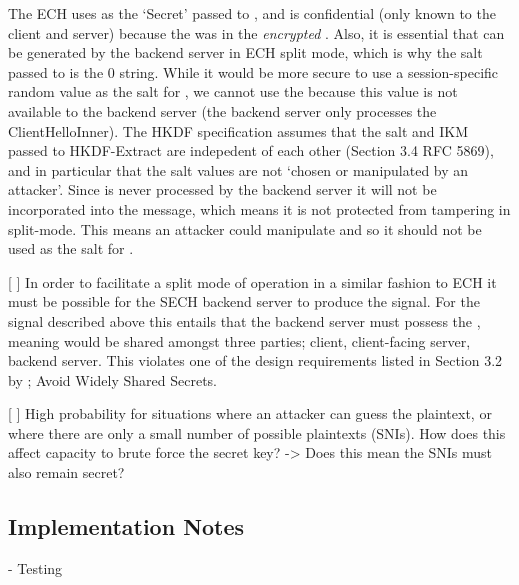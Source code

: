 The ECH  uses  as the `Secret' passed to , and  is confidential (only known to the client and server) because the  was in the {\em encrypted} . Also, it is essential that  can be generated by the backend server in ECH split mode, which is why the salt passed to  is the 0 string. While it would be more secure to use a session-specific random value as the salt for , we cannot use the  because this value is not available to the backend server (the backend server only processes the ClientHelloInner). The HKDF specification assumes that the salt and IKM passed to HKDF-Extract are indepedent of each other (Section 3.4 RFC 5869), and in particular that the salt values are not `chosen or manipulated by an attacker'.
Since  is never processed by the backend server it will not be incorporated into the  message, which means it is not protected from tampering in split-mode. This means an attacker could manipulate  and so it should not be used as the salt for .

[ ] In order to facilitate a split mode of operation in a similar fashion to ECH it must be possible for the SECH backend server to produce  the  signal. For the signal described above this entails that the backend server must possess the , meaning  would be shared amongst three parties; client, client-facing server, backend server. This violates one of the design requirements listed in Section 3.2 by \cite{rfc8744-issues}; Avoid Widely Shared Secrets.

[ ] High probability for situations where an attacker can guess the plaintext, or where there are only a small number of possible plaintexts (SNIs). How does this affect capacity to brute force the secret key? -> Does this mean the SNIs must also remain secret?

\subsection{Implementation Notes}
    - Testing
